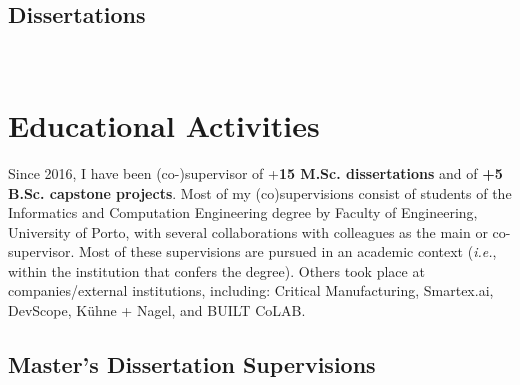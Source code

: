 \documentclass[10pt, a4paper]{article}
\newcommand{\FEUP}{Faculty of Engineering, University of Porto}
\newcommand{\years}[1]{\marginnote{\raggedleft\footnotesize #1}}
\begin{document}
\begin{etaremune}
	\renewcommand\labelenumi{\footnotesize\theenumi .}
	\item {}
	\item {}
	\item {}
	\item {}
	\item {}
\end{etaremune}

\subsection*{Dissertations}


\years{2022} 
\\[0.42em]
\years{2016} 




\section*{Educational Activities}

Since 2016, I have been (co-)supervisor of +\textbf{15 M.Sc. dissertations} and of \textbf{+5 B.Sc. capstone projects}. Most of my (co)supervisions consist of students of the Informatics and Computation Engineering degree by \FEUP, with several collaborations with colleagues as the main or co-supervisor. Most of these supervisions are pursued in an academic context (\textit{i.e.}, within the institution that confers the degree). Others took place at companies/external institutions, including: Critical Manufacturing, Smartex.ai, DevScope, Kühne + Nagel, and BUILT CoLAB.

\subsection*{Master's Dissertation Supervisions}
\end{document}
